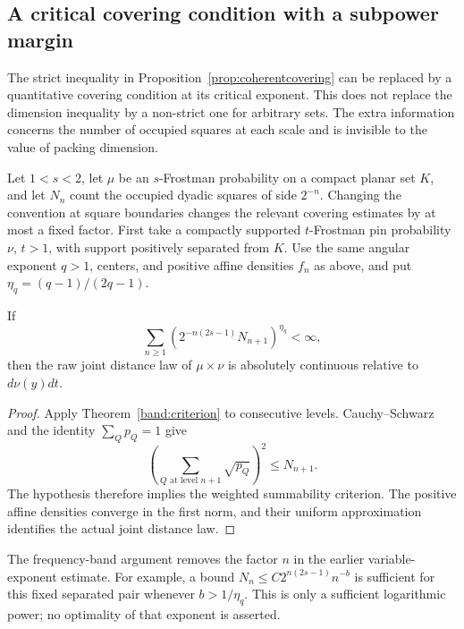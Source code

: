 \subsection{A critical covering condition with a subpower margin}
\label{endpoint:covering-section}

The strict inequality in Proposition~\ref{prop:coherentcovering} can be
replaced by a quantitative covering condition at its critical exponent.
This does not replace the dimension inequality by a non-strict one for
arbitrary sets. The extra information concerns the number of occupied
squares at each scale and is invisible to the value of packing dimension.

Let \(1<s<2\), let \(\mu\) be an \(s\)-Frostman probability on a
compact planar set \(K\), and let \(N_n\) count the occupied dyadic
squares of side \(2^{-n}\). Changing the convention at square boundaries
changes the relevant covering estimates by at most a fixed factor.
First take a compactly supported \(t\)-Frostman pin probability \(\nu\),
\(t>1\), with support positively separated from \(K\). Use the same
angular exponent \(q>1\), centers, and positive affine densities \(f_n\)
as above, and put \(\eta_q=(q-1)/(2q-1)\).

\begin{proposition}
\label{endpoint:criterion}
If
\begin{equation}\label{endpoint:series}
 \sum_{n\ge1}
 \left(2^{-n(2s-1)}N_{n+1}\right)^{\eta_q}<\infty,
\end{equation}
then the raw joint distance law of \(\mu\times\nu\) is absolutely
continuous relative to \(d\nu(y)dt\).
\end{proposition}

\begin{proof}
Apply Theorem~\ref{band:criterion} to consecutive levels. Cauchy--Schwarz
and the identity \(\sum_Qp_Q=1\) give
\[
 \left(\sum_{Q\text{ at level }n+1}\sqrt{p_Q}\right)^2
 \le N_{n+1}.
\]
The hypothesis therefore implies the weighted summability criterion.
The positive affine densities converge in the first norm, and their
uniform approximation identifies the actual joint distance law.
\end{proof}

The frequency-band argument removes the factor \(n\) in the earlier
variable-exponent estimate. For example, a bound
\(N_n\le C2^{n(2s-1)}n^{-b}\) is sufficient for this fixed separated
pair whenever \(b>1/\eta_q\). This is only a sufficient logarithmic
power; no optimality of that exponent is asserted.

